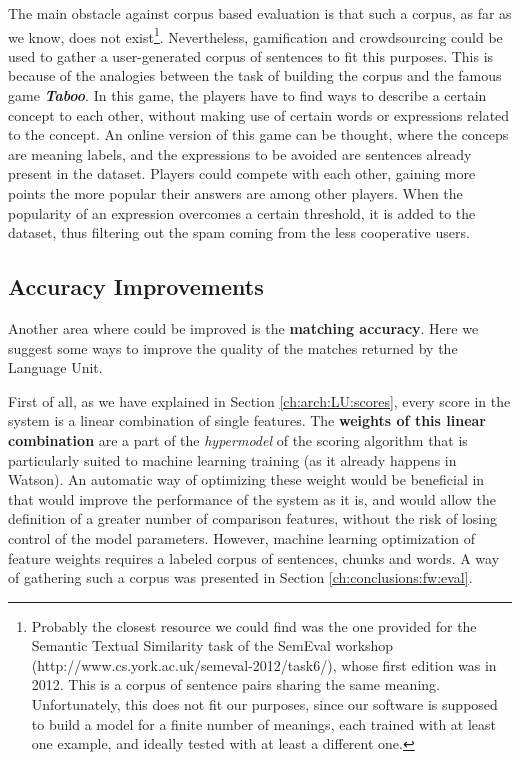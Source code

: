 The main obstacle against corpus based evaluation is that such a corpus, as far as we know, does not exist\footnote{Probably the closest resource we could find was the one provided for the Semantic Textual Similarity task of the SemEval workshop (http://www.cs.york.ac.uk/semeval-2012/task6/), whose first edition was in 2012. This is a corpus of sentence pairs sharing the same meaning. Unfortunately, this does not fit our purposes, since our software is supposed to build a model for a finite number of meanings, each trained with at least one example, and ideally tested with at least a different one.}. Nevertheless, gamification and crowdsourcing could be used to gather a user-generated corpus of sentences to fit this purposes. This is because of the analogies between the task of building the corpus and the famous game \textbf{\textit{Taboo}}. In this game, the players have to find ways to describe a certain concept to each other, without making use of certain words or expressions related to the concept. An online version of this game can be thought, where the conceps are meaning labels, and the expressions to be avoided are sentences already present in the dataset. Players could compete with each other, gaining more points the more popular their answers are among other players. When the popularity of an expression overcomes a certain threshold, it is added to the dataset, thus filtering out the spam coming from the less cooperative users.


\subsection{Accuracy Improvements} \label{ch:conclusions:fw:accuracy}
Another area where \pname could be improved is the \textbf{matching accuracy}. Here we suggest some ways to improve the quality of the matches returned by the Language Unit.

First of all, as we have explained in Section \ref{ch:arch:LU:scores}, every score in the system is a linear combination of single features. The \textbf{weights of this linear combination} are a part of the \textit{hypermodel} of the scoring algorithm that is particularly suited to machine learning training (as it already happens in Watson). An automatic way of optimizing these weight would be beneficial in that would improve the performance of the system as it is, and would allow the definition of a greater number of comparison features, without the risk of losing control of the model parameters. However, machine learning optimization of feature weights requires a labeled corpus of sentences, chunks and words. A way of gathering such a corpus was presented in Section \ref{ch:conclusions:fw:eval}.

